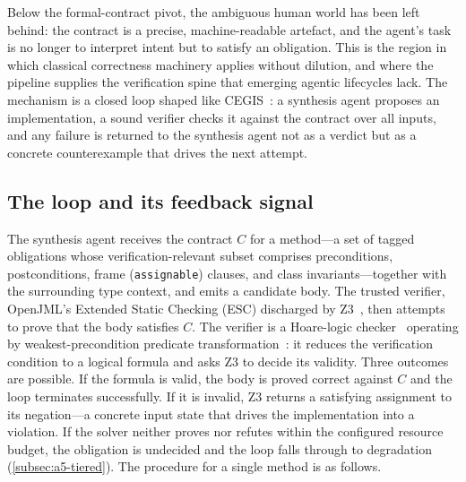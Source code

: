 Below the formal-contract pivot, the ambiguous human world has been left behind: the contract is a precise, machine-readable artefact, and the agent's task is no longer to interpret intent but to satisfy an obligation. This is the region in which classical correctness machinery applies without dilution, and where the pipeline supplies the verification spine that emerging agentic lifecycles lack. The mechanism is a closed loop shaped like CEGIS~\cite{solarlezama2006sketching,solarlezama2008sketching}: a synthesis agent proposes an implementation, a sound verifier checks it against the contract over all inputs, and any failure is returned to the synthesis agent not as a verdict but as a concrete counterexample that drives the next attempt.

\subsection{The loop and its feedback signal}\label{subsec:a5-signal}

The synthesis agent receives the contract $C$ for a method---a set of tagged obligations whose verification-relevant subset comprises preconditions, postconditions, frame (\texttt{assignable}) clauses, and class invariants---together with the surrounding type context, and emits a candidate body. The trusted verifier, OpenJML's Extended Static Checking (ESC) discharged by Z3~\cite{cok2014openjml,demoura2008z3}, then attempts to prove that the body satisfies $C$. The verifier is a Hoare-logic checker~\cite{hoare1969axiomatic} operating by weakest-precondition predicate transformation~\cite{dijkstra1975guarded}: it reduces the verification condition to a logical formula and asks Z3 to decide its validity. Three outcomes are possible. If the formula is valid, the body is proved correct against $C$ and the loop terminates successfully. If it is invalid, Z3 returns a satisfying assignment to its negation---a concrete input state that drives the implementation into a violation. If the solver neither proves nor refutes within the configured resource budget, the obligation is undecided and the loop falls through to degradation (\cref{subsec:a5-tiered}). The procedure for a single method is as follows.

